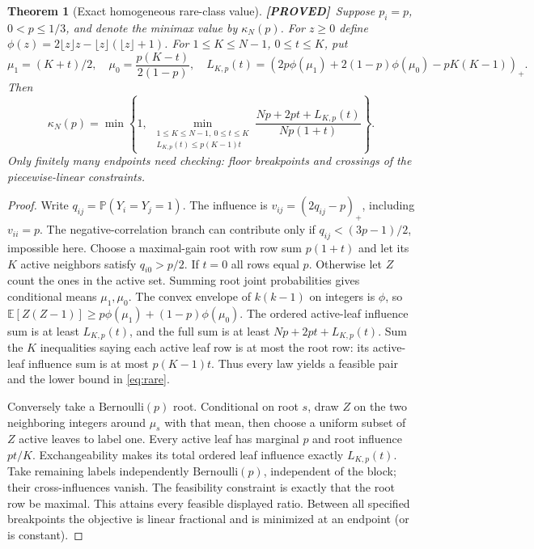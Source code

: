 \documentclass[11pt]{article}
\newtheorem{theorem}{Theorem}[section]
\theoremstyle{definition}
\newcommand{\E}{\mathbb E}
\newcommand{\Pp}{\mathbb P}
\newcommand{\1}{\mathbf 1}
\newcommand{\pos}[1]{\left(#1\right)_{+}}
\newcommand{\pr}{\textbf{[PROVED]}}
\begin{document}
\begin{theorem}[Exact homogeneous rare-class value]\label{th:rare}
\pr\ Suppose $p_i=p$, $0<p\le1/3$, and denote the minimax value by
$\kappa_N(p)$. For $z\ge0$ define
$\phi(z)=2\lfloor z\rfloor z-\lfloor z\rfloor(\lfloor z\rfloor+1)$.
For $1\le K\le N-1$, $0\le t\le K$, put
\[
 \mu_1=(K+t)/2,\quad
 \mu_0=\frac{p(K-t)}{2(1-p)},\quad
 L_{K,p}(t)=\pos{2p\phi(\mu_1)+2(1-p)\phi(\mu_0)-pK(K-1)}.
\]
Then
\begin{equation}\label{eq:rare}
 \boxed{\kappa_N(p)=
 \min\left\{1,\
 \min_{\substack{1\le K\le N-1,\ 0\le t\le K\\
 L_{K,p}(t)\le p(K-1)t}}
 \frac{Np+2pt+L_{K,p}(t)}{Np(1+t)}
 \right\}.}
\end{equation}
Only finitely many endpoints need checking: floor breakpoints and crossings
of the piecewise-linear constraints.
\end{theorem}
\begin{proof}
Write $q_{ij}=\Pp(Y_i=Y_j=1)$. The influence is $v_{ij}=(2q_{ij}-p)_+$,
including $v_{ii}=p$. The negative-correlation branch can contribute only
if $q_{ij}<(3p-1)/2$, impossible here.
Choose a maximal-gain root with row sum $p(1+t)$ and let its $K$ active
neighbors satisfy $q_{i0}>p/2$. If $t=0$ all rows equal $p$.
Otherwise let $Z$ count the ones in the active set.
Summing root joint probabilities gives conditional means $\mu_1,\mu_0$.
The convex envelope of $k(k-1)$ on integers is $\phi$, so
$\E[Z(Z-1)]\ge p\phi(\mu_1)+(1-p)\phi(\mu_0)$.
The ordered active-leaf influence sum is at least $L_{K,p}(t)$, and the full
sum is at least $Np+2pt+L_{K,p}(t)$.
Sum the $K$ inequalities saying each active leaf row is at most the root
row: its active-leaf influence sum is at most $p(K-1)t$.
Thus every law yields a feasible pair and the lower bound in \eqref{eq:rare}.

Conversely take a $\mathrm{Bernoulli}(p)$ root. Conditional on root $s$,
draw $Z$ on the two neighboring integers around $\mu_s$ with that mean,
then choose a uniform subset of $Z$ active leaves to label one.
Every active leaf has marginal $p$ and root influence $pt/K$.
Exchangeability makes its total ordered leaf influence exactly $L_{K,p}(t)$.
Take remaining labels independently $\mathrm{Bernoulli}(p)$, independent of
the block; their cross-influences vanish.
The feasibility constraint is exactly that the root row be maximal.
This attains every feasible displayed ratio. Between all specified
breakpoints the objective is linear fractional and is minimized at an
endpoint (or is constant).
\end{proof}
\end{document}
